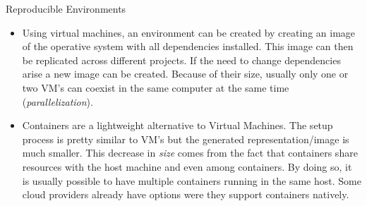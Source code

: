 \begin{pattern}{Reproducible Environments}
\begin{itemize}
            \item Using virtual machines, an environment can be created by creating an image of the operative system with all dependencies installed. This image can then be replicated across different projects. If the need to change dependencies arise a new image can be created. Because of their size, usually only one or two VM's can coexist in the same computer at the same time (\textit{parallelization}).

            \item Containers are a lightweight alternative to Virtual Machines. The setup process is pretty similar to VM’s but the generated representation/image is much smaller. This decrease in \textit{size} comes from the fact that containers share resources with the host machine and even among containers. By doing so, it is usually possible to have multiple containers running in the same host. Some cloud providers already have options were they support containers natively.
        \end{itemize}

\end{pattern}
















